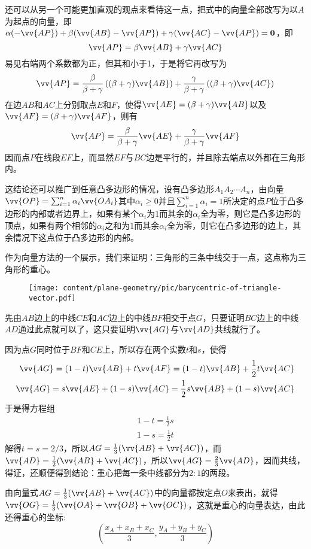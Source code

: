 \begin{example}
  还可以从另一个可能更加直观的观点来看待这一点，把式中的向量全部改写为以$A$为起点的向量，即$\alpha (-\vv{AP})+\beta (\vv{AB}-\vv{AP})+\gamma (\vv{AC}-\vv{AP})=\bm{0}$，即
  \[ \vv{AP} = \beta \vv{AB} + \gamma \vv{AC} \]
  易见右端两个系数都为正，但其和小于1，于是将它再改写为
  \[ \vv{AP} = \frac{\beta}{\beta+\gamma} \left( (\beta+\gamma)\vv{AB} \right) + \frac{\gamma}{\beta+\gamma} \left( (\beta+\gamma) \vv{AC} \right) \]
  在边$AB$和$AC$上分别取点$E$和$F$，使得$\vv{AE} = (\beta+\gamma)\vv{AB}$以及$\vv{AF}=(\beta+\gamma)\vv{AF}$，则有
  \[ \vv{AP}=\frac{\beta}{\beta+\gamma} \vv{AE} + \frac{\gamma}{\beta+\gamma} \vv{AF} \]
  因而点$P$在线段$EF$上，而显然$EF$与$BC$边是平行的，并且除去端点以外都在三角形内。

  这结论还可以推广到任意凸多边形的情况，设有凸多边形$A_1A_2\cdots A_n$，由向量$\vv{OP}=\sum_{i=1}^n\alpha_i\vv{OA_i}$其中$\alpha_i\geqslant 0$并且$\sum_{i=1}^n\alpha_i=1$所决定的点$P$位于凸多边形的内部或者边界上，如果有某个$\alpha_i$为1而其余的$\alpha_i$全为零，则它是凸多边形的顶点，如果有两个相邻的$\alpha_i$之和为1而其余$\alpha_i$全为零，则它在凸多边形的边上，其余情况下这点位于凸多边形的内部。
\end{example}

\begin{example}[三角形的重心]
  \label{example:barycentric-of-triangle-vector}
  作为向量方法的一个展示，我们来证明：三角形的三条中线交于一点，这点称为三角形的重心。
  
\begin{figure}[htbp]
\centering
\texttt{[image: content/plane-geometry/pic/barycentric-of-triangle-vector.pdf]}
\caption{}
\label{fig:barycentric-of-triangle-vector}
\end{figure}

  先由$AB$边上的中线$CE$和$AC$边上的中线$BF$相交于点$G$，只要证明$BC$边上的中线$AD$通过此点就可以了，这只要证明$\vv{AG}$与$\vv{AD}$共线就行了。

  因为点$G$同时位于$BF$和$CE$上，所以存在两个实数$t$和$s$，使得
  \begin{eqnarray*}
    \vv{AG} = (1-t) \vv{AB} + t \vv{AF} = (1-t) \vv{AB} + \frac{1}{2} t \vv{AC} \\
    \vv{AG} = s \vv{AE} + (1-s) \vv{AC} = \frac{1}{2} s \vv{AB} + (1-s) \vv{AC}
  \end{eqnarray*}
  于是得方程组
  \begin{eqnarray*}
    1-t = \frac{1}{2} s \\
    1-s = \frac{1}{2} t
  \end{eqnarray*}
  解得$t=s=2/3$，所以$AG=\frac{1}{3}(\vv{AB}+\vv{AC})$，而$\vv{AD}=\frac{1}{2}(\vv{AB}+\vv{AC})$，所以$\vv{AG}=\frac{2}{3}\vv{AD}$，因而共线，得证，还顺便得到结论：重心把每一条中线都分为$2:1$的两段。

  由向量式$AG=\frac{1}{3}(\vv{AB}+\vv{AC})$中的向量都按定点$O$来表出，就得$\vv{OG}=\frac{1}{3}(\vv{OA}+\vv{OB}+\vv{OC})$，这就是重心的向量表达，由此还得重心的坐标:
  \begin{equation*}
    \left( \frac{x_A+x_B+x_C}{3}, \frac{y_A+y_B+y_C}{3} \right)
  \end{equation*}
\end{example}

